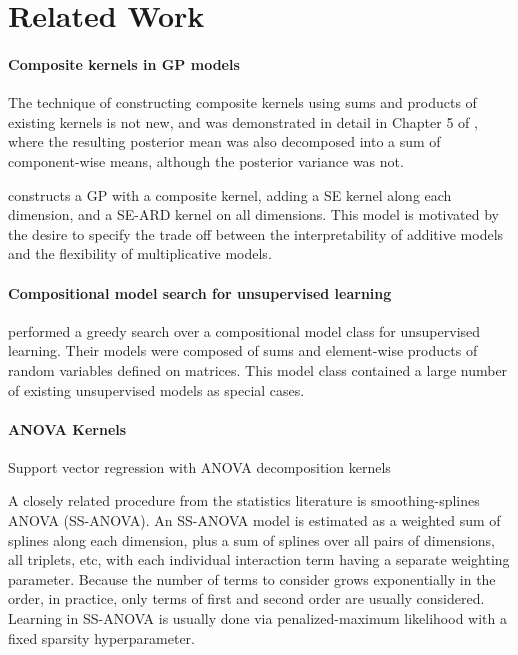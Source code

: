 \documentclass[twoside]{article}
\begin{document}
\section{Related Work}

\paragraph{Composite kernels in GP models} The technique of constructing composite kernels using sums and products of existing kernels is not new, and was demonstrated in detail in Chapter 5 of \cite{rasmussen38gaussian}, where the resulting posterior mean was also decomposed into a sum of component-wise means, although the posterior variance was not.

\cite{plate1999accuracy} constructs a GP with a composite kernel, adding a SE kernel along each dimension, and a SE-ARD kernel on all dimensions.  This model is motivated by the desire to specify the trade off between the interpretability of additive models and the flexibility of multiplicative models.

\paragraph{Compositional model search for unsupervised learning} \cite{grosse2012exploiting} performed a greedy search over a compositional model class for unsupervised learning.  Their models were composed of sums and element-wise products of random variables defined on matrices.  This model class contained a large number of existing unsupervised models as special cases.

\paragraph{ANOVA Kernels}

Support vector regression with ANOVA decomposition kernels \cite{stitson1999support}

A closely related procedure from the statistics literature is smoothing-splines ANOVA (SS-ANOVA)\cite{wahba1990spline, gu2002smoothing}.
An SS-ANOVA model is estimated as a weighted sum of splines along each dimension, plus a sum of splines over all pairs of dimensions, all triplets, etc, with each individual interaction term having a separate weighting parameter.
Because the number of terms to consider grows exponentially in the order, in practice, only terms of first and second order are usually considered.
Learning in SS-ANOVA is usually done via penalized-maximum likelihood with a fixed sparsity hyperparameter.
\end{document}
